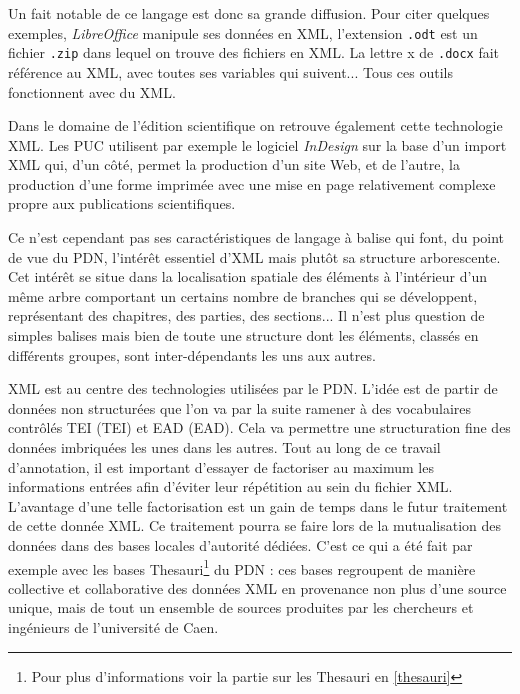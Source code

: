 \documentclass[a4paper,12pt,twoside]{book}
\begin{document}
    
   Un fait notable de ce langage est donc sa grande diffusion. Pour citer quelques exemples, \textit{LibreOffice} manipule ses données en \acrshort{XML}, l'extension \texttt{.odt} est un fichier \texttt{.zip} dans lequel on trouve des fichiers en \acrshort{XML}. La lettre \og x \fg{} de \texttt{.docx} fait référence au \acrshort{XML}, avec toutes ses variables qui suivent... Tous ces outils fonctionnent avec du XML.
   
   Dans le domaine de l'édition scientifique on retrouve également cette technologie XML. Les \acrshort{PUC} utilisent par exemple le logiciel \textit{InDesign} sur la base d'un import \acrshort{XML} qui, d'un côté, permet la production d'un site Web, et de l'autre, la production d'une forme imprimée avec une mise en page relativement complexe propre aux publications scientifiques.
    
    Ce n'est cependant pas ses caractéristiques de langage à balise qui font, du point de vue du \acrshort{PDN}, l'intérêt essentiel d'\acrshort{XML} mais plutôt sa structure arborescente. Cet intérêt se situe dans la localisation \og spatiale \fg{} des éléments à l'intérieur d'un même arbre comportant un certains nombre de branches qui se développent, représentant des chapitres, des parties, des sections... Il n'est plus question de simples balises mais bien de toute une structure dont les éléments, classés en différents groupes, sont inter-dépendants les uns aux autres.
    
   \acrshort{XML} est au centre des technologies utilisées par le \acrshort{PDN}. L'idée est de partir de données non structurées que l'on va par la suite ramener à des vocabulaires contrôlés \acrshort{TEI} (\acrlong{TEI}) et \acrshort{EAD} (\acrlong{EAD}). Cela va permettre une structuration fine des données imbriquées les unes dans les autres. Tout au long de ce travail d'annotation, il est important d'essayer de factoriser au maximum les informations entrées afin d'éviter leur répétition au sein du fichier XML. L'avantage d'une telle factorisation est un gain de temps dans le futur traitement de cette donnée XML. Ce traitement pourra se faire lors de la mutualisation des données dans des bases locales d'autorité dédiées. C'est ce qui a été fait par exemple avec les bases Thesauri\footnote{Pour plus d'informations voir la partie sur les Thesauri en \ref{thesauri}} du \acrshort{PDN} : ces bases regroupent de manière collective et collaborative des données XML en provenance non plus d'une source unique, mais de tout un ensemble de sources produites par les chercheurs et ingénieurs de l'université de Caen.
   
\end{document}
